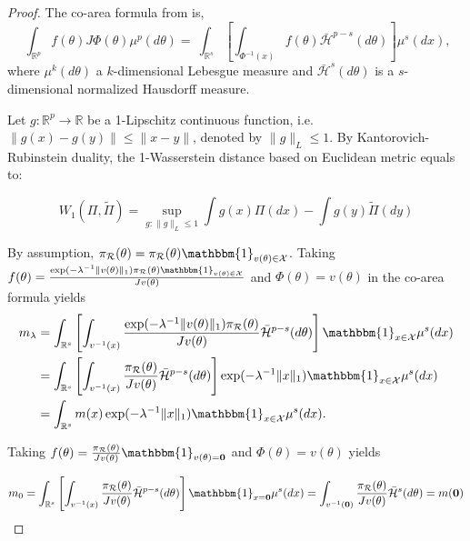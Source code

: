 \documentclass[10pt,fleqn]{article}
\newcommand{\mc}[1]{\mathcal{#1}}
\DeclareMathOperator{\1}{\mathbbm{1}}
\begin{document}
\begin{proof}[Proof]

The co-area formula from \cite{federer2014geometric} is,
 \begin{equation}
 \ \int_{\mathbb{R}^p}  f(\theta)J\Phi(\theta)\mu^p(d \theta)
 =\ \int_{\mathbb{R}^{s}} \left[   \int_{\Phi^{-1}(x)}f(\theta)  \bar{\mc H}^{p-s}(d\theta) \right]\mu^{s}(d x),
 \end{equation}
 where $\mu^k(d\theta)$ a $k$-dimensional Lebesgue measure and $\bar{\mc H}^{s}(d\theta)$ is a $s$-dimensional normalized Hausdorff measure.


Let $g:\mathbb{R}^p\rightarrow \mathbb{R}$ be a 1-Lipschitz continuous function, i.e. $\|g(x)-g(y)\|\le \|x-y\|$, denoted by $\|g\|_L\le 1$. 
By Kantorovich-Rubinstein duality, the 1-Wasserstein distance based on Euclidean metric equals to: 

\begin{equation}
W_1(\Pi,\tilde\Pi)=\underset{g:\|g\|_L\le 1}\sup \int g(x) \Pi(dx) -  \int g(y) \tilde\Pi(dy) 
\end{equation}

By assumption, $\pi_{\mc R}(\theta)= \pi_{\mc R}(\theta) \mathbbm{1}_{v(\theta)\in
\mathcal X}$. Taking $f(\theta)=\frac{ \exp(- \lambda^{-1}\| v(\theta) \|_1) \pi_{\mc R}(\theta) \mathbbm{1}_{v(\theta)\in
\mathcal X}}{ J v(\theta) }$ and $\Phi(\theta)=v(\theta)$ in the co-area formula yields
\begin{equation}
\begin{aligned}
m_\lambda
& = \int_{\mathbb{R}^{s}}\left[ \int_{v^{-1}(x)} \frac{ \exp(- \lambda^{-1}\| v(\theta) \|_1) \pi_{\mc R}(\theta)}{ J v(\theta) }  \bar{\mc H}^{p-s}(d \theta) \right]  \mathbbm{1}_{x\in
\mathcal X}\mu^{s}(d x) \\
& = \int_{\mathbb{R}^{s}}\left[ \int_{v^{-1}(x)} \frac{  \pi_{\mc R}(\theta)}{ J v(\theta) }  \bar{\mc H}^{p-s}(d \theta) \right] \exp(- \lambda^{-1}\| x \|_1) \mathbbm{1}_{x\in
\mathcal X}\mu^{s}(d x) \\
& = \int_{\mathbb{R}^{s}}  m(x)\exp(- \lambda^{-1} \| x\|_1 )  \mathbbm{1}_{x\in
\mathcal X}\mu^{s}(d x)  .
\end{aligned}
\end{equation}

Taking $f(\theta)=\frac{\pi_{\mc R}(\theta)}{ J v(\theta) } \mathbbm{1}_{v(\theta)=
\bf 0}$ and $\Phi(\theta)=v(\theta)$ yields 


\begin{equation}
m_0
= \int_{\mathbb{R}^{s}} \left[ \int_{v^{-1}(x)} \frac{ \pi_{\mc R}(\theta) }{ J v(\theta) }  \bar{\mc H}^{p-
s}(d \theta) \right]\mathbbm{1}_{x={\bf 0}} \mu^{s}(d x)    =  \int_{v^{-1}({\bf 0})} \frac{ \pi_{\mc R}(\theta) }{ J v(\theta) } \bar{\mc H}^{s}(d \theta) =m({\bf 0})
\end{equation}



\end{proof}
\end{document}
